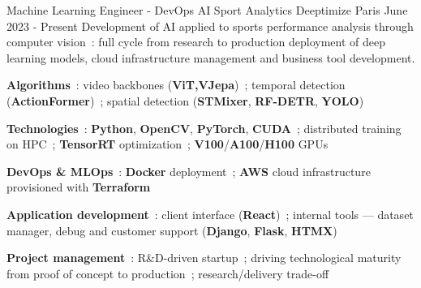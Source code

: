 

\begin{cventries}

	\cventry
	{Machine Learning Engineer - DevOps}
	{AI Sport Analytics}
	{Deeptimize} %
	{Paris} %
	{June 2023 - Present} %
	{Development of AI applied to sports performance analysis through computer vision~: full cycle from research to production deployment of deep learning models, cloud infrastructure management and business tool development.} %
	{
		\begin{cvitems}
			\item{\textbf{Algorithms}~: video backbones (\textbf{ViT,VJepa})~; temporal detection (\textbf{ActionFormer})~; spatial detection (\textbf{STMixer}, \textbf{RF-DETR}, \textbf{YOLO})}
			\item{\textbf{Technologies}~: \textbf{Python}, \textbf{OpenCV}, \textbf{PyTorch}, \textbf{CUDA}~; distributed training on HPC~; \textbf{TensorRT} optimization~; \textbf{V100}\slash\textbf{A100}\slash\textbf{H100} GPUs}
			\item{\textbf{DevOps \& MLOps}~: \textbf{Docker} deployment~; \textbf{AWS} cloud infrastructure provisioned with \textbf{Terraform}}
			\item{\textbf{Application development}~: client interface (\textbf{React})~; internal tools --- dataset manager, debug and customer support (\textbf{Django}, \textbf{Flask}, \textbf{HTMX})}
			\item{\textbf{Project management}~: R\&D-driven startup~; driving technological maturity from proof of concept to production~; research\slash delivery trade-off}
		\end{cvitems}
	}


\end{cventries}
